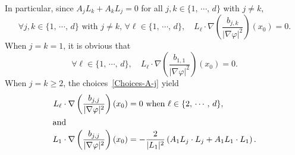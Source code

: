 \documentclass[AHL,Unicode,longabstracts]{cedram}
\renewcommand{\geq}{\geqslant}
\let\oldforall\forall
\renewcommand*{\forall}{\mathrel{\oldforall}}
\begin{document}
In particular, since $A_j L_k + A_k L_j = 0$ for all $j, k \in \{1,\, \cdots,\, d\}$ with $j \neq k$,
\[
\forall j, k \in \{1,\, \cdots,\, d\} \text{ with }j \neq k, \,
\forall \ell \in \{1,\, \cdots,\, d\}, \quad L_\ell \cdot \nabla \left(\frac{b_{j,k}}{|\nabla \varphi|^2} \right) (x_0) = 0.
\]
When $j = k = 1$, it is obvious that
\[
\forall \ell \in \{1,\, \cdots,\, d\}, \quad L_\ell \cdot \nabla \left(\frac{b_{1,1}}{|\nabla \varphi|^2} \right) (x_0) = 0.
\]
When $j = k \geq 2$, the choices~\eqref{Choices-A-j} yield
\begin{align*}
L_\ell \cdot \nabla \left(\frac{b_{j,j}}{|\nabla \varphi|^2} \right) (x_0) &= 0 \text{ when } \ell \in \{2,\, \cdots,\, d \},
\\
\intertext{and}
L_1 \cdot \nabla \left(\frac{b_{j,j}}{|\nabla \varphi|^2} \right) (x_0) &= -\frac{2}{|L_1|^2} \left(A_1 L_j \cdot L_j + A_1 L_1 \cdot L_1\right).
\end{align*}
\end{document}
